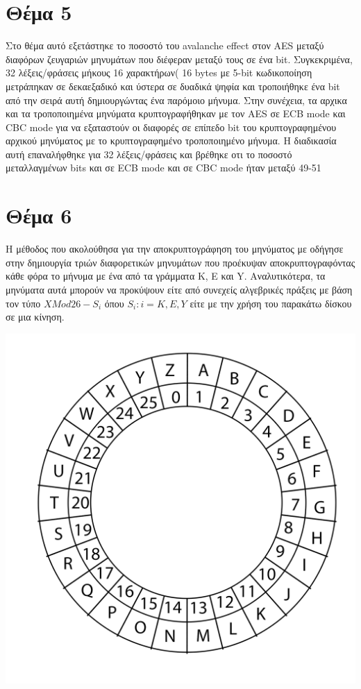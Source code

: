 \documentclass[a4paper, 11pt]{article}
\newcommand{\lt}{\latintext}
\begin{document}
\newpage


\section*{Θέμα 5}
Στο θέμα αυτό εξετάστηκε το ποσοστό του {\lt avalanche effect} στον {\lt AES} μεταξύ διαφόρων ζευγαριών μηνυμάτων που διέφεραν μεταξύ τους σε ένα {\lt bit}.
Συγκεκριμένα, 32 λέξεις/φράσεις μήκους 16 χαρακτήρων( 16 {\lt bytes} με 5-{\lt bit} κωδικοποίηση μετράπηκαν σε δεκαεξαδικό και ύστερα σε δυαδικά ψηφία
και τροποιήθηκε ένα {\lt bit} από την σειρά αυτή δημιουργώντας ένα παρόμοιο μήνυμα.
Στην συνέχεια, τα αρχικα και τα τροποποιημένα μηνύματα κρυπτογραφήθηκαν με τον {\lt AES} σε {\lt ECB mode} και {\lt CBC mode} για να εξαταστούν
οι διαφορές σε επίπεδο {\lt bit} του κρυπτογραφημένου αρχικού μηνύματος με το κρυπτογραφημένο τροποποιημένο μήνυμα.
Η διαδικασία αυτή επαναλήφθηκε για 32 λέξεις/φράσεις και βρέθηκε οτι το ποσοστό μεταλλαγμένων bits και σε {\lt ECB mode} και σε {\lt CBC mode} ήταν μεταξύ 49-51%




\newpage
\section*{Θέμα 6}

Η μέθοδος που ακολούθησα για την αποκρυπτογράφηση του μηνύματος με οδήγησε στην δημιουργία τριών διαφορετικών μηνυμάτων που προέκυψαν αποκρυπτογραφόντας κάθε φόρα το μήνυμα με ένα από τα γράμματα {\lt K}, {\lt E} και {\lt Y}.
Αναλυτικότερα, τα μηνύματα αυτά μπορούν να προκύψουν είτε από συνεχείς αλγεβρικές πράξεις με βάση τον τύπο $ X  Μod 26 - S_{i} $ όπου $S_{i} : i = {K, E, Y} $ είτε με την χρήση του παρακάτω δίσκου σε μια κίνηση.

\centerline{\includegraphics[scale=0.5]{disk.png}}
\end{document}
